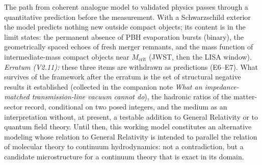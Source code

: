 \documentclass[11pt,a4paper]{article}
\theoremstyle{plain}
\theoremstyle{remark}
\begin{document}
The path from coherent analogue model to validated physics passes through a quantitative prediction before the measurement. With a Schwarzschild exterior the model predicts nothing new outside compact objects; its content is in the limit states: the permanent absence of PBH evaporation bursts (binary), the geometrically spaced echoes of fresh merger remnants, and the mass function of intermediate-mass compact objects near $M_{\text{crit}}$ (JWST, then the LISA window). \emph{Erratum (V2.11):} these three items are withdrawn as predictions (E6--E7). What survives of the framework after the erratum is the set of structural negative results it established (collected in the companion note \emph{What an impedance-matched transmission-line vacuum cannot do}), the hadronic ratios of the matter-sector record, conditional on two posed integers, and the medium as an interpretation without, at present, a testable addition to General Relativity or to quantum field theory. Until then, this working model constitutes an alternative modeling whose relation to General Relativity is intended to parallel the relation of molecular theory to continuum hydrodynamics: not a contradiction, but a candidate microstructure for a continuum theory that is exact in its domain.
\end{document}
